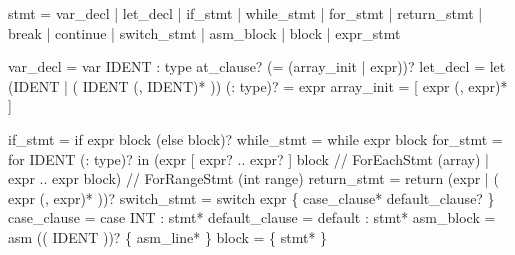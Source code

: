 \documentclass[
  11pt,
]{article}
\newenvironment{Shaded}{}{}
\newcommand{\NormalTok}[1]{#1}
\begin{document}
\begin{Shaded}
\begin{Highlighting}[]
\NormalTok{stmt           = var\_decl | let\_decl | if\_stmt | while\_stmt | for\_stmt}
\NormalTok{               | return\_stmt | \textquotesingle{}break\textquotesingle{} | \textquotesingle{}continue\textquotesingle{} | switch\_stmt}
\NormalTok{               | asm\_block | block | expr\_stmt}

\NormalTok{var\_decl       = \textquotesingle{}var\textquotesingle{} IDENT \textquotesingle{}:\textquotesingle{} type at\_clause? (\textquotesingle{}=\textquotesingle{} (array\_init | expr))?}
\NormalTok{let\_decl       = \textquotesingle{}let\textquotesingle{} (IDENT | \textquotesingle{}(\textquotesingle{} IDENT (\textquotesingle{},\textquotesingle{} IDENT)* \textquotesingle{})\textquotesingle{}) (\textquotesingle{}:\textquotesingle{} type)? \textquotesingle{}=\textquotesingle{} expr}
\NormalTok{array\_init     = \textquotesingle{}[\textquotesingle{} expr (\textquotesingle{},\textquotesingle{} expr)* \textquotesingle{}]\textquotesingle{}}

\NormalTok{if\_stmt        = \textquotesingle{}if\textquotesingle{} expr block (\textquotesingle{}else\textquotesingle{} block)?}
\NormalTok{while\_stmt     = \textquotesingle{}while\textquotesingle{} expr block}
\NormalTok{for\_stmt       = \textquotesingle{}for\textquotesingle{} IDENT (\textquotesingle{}:\textquotesingle{} type)? \textquotesingle{}in\textquotesingle{}}
\NormalTok{                 (expr \textquotesingle{}[\textquotesingle{} expr? \textquotesingle{}..\textquotesingle{} expr? \textquotesingle{}]\textquotesingle{} block   // ForEachStmt (array)}
\NormalTok{                 | expr \textquotesingle{}..\textquotesingle{} expr block)                  // ForRangeStmt (int range)}
\NormalTok{return\_stmt    = \textquotesingle{}return\textquotesingle{} (expr | \textquotesingle{}(\textquotesingle{} expr (\textquotesingle{},\textquotesingle{} expr)* \textquotesingle{})\textquotesingle{})?}
\NormalTok{switch\_stmt    = \textquotesingle{}switch\textquotesingle{} expr \textquotesingle{}\{\textquotesingle{} case\_clause* default\_clause? \textquotesingle{}\}\textquotesingle{}}
\NormalTok{case\_clause    = \textquotesingle{}case\textquotesingle{} INT \textquotesingle{}:\textquotesingle{} stmt*}
\NormalTok{default\_clause = \textquotesingle{}default\textquotesingle{} \textquotesingle{}:\textquotesingle{} stmt*}
\NormalTok{asm\_block      = \textquotesingle{}asm\textquotesingle{} (\textquotesingle{}(\textquotesingle{} IDENT \textquotesingle{})\textquotesingle{})? \textquotesingle{}\{\textquotesingle{} asm\_line* \textquotesingle{}\}\textquotesingle{}}
\NormalTok{block          = \textquotesingle{}\{\textquotesingle{} stmt* \textquotesingle{}\}\textquotesingle{}}


\end{Highlighting}
\end{Shaded}
\end{document}

